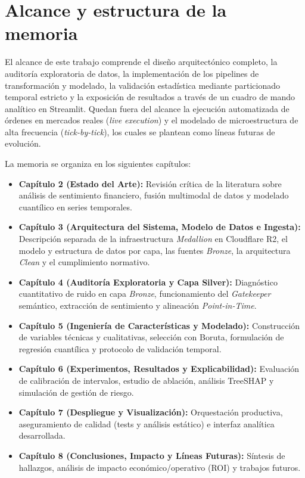\section{Alcance y estructura de la memoria}
El alcance de este trabajo comprende el diseño arquitectónico completo, la auditoría exploratoria de datos, la implementación de los pipelines de transformación y modelado, la validación estadística mediante particionado temporal estricto y la exposición de resultados a través de un cuadro de mando analítico en Streamlit. Quedan fuera del alcance la ejecución automatizada de órdenes en mercados reales (\textit{live execution}) y el modelado de microestructura de alta frecuencia (\textit{tick-by-tick}), los cuales se plantean como líneas futuras de evolución.

La memoria se organiza en los siguientes capítulos:
\begin{itemize}
    \item \textbf{Capítulo 2 (Estado del Arte):} Revisión crítica de la literatura sobre análisis de sentimiento financiero, fusión multimodal de datos y modelado cuantílico en series temporales.
    \item \textbf{Capítulo 3 (Arquitectura del Sistema, Modelo de Datos e Ingesta):} Descripción separada de la infraestructura \textit{Medallion} en Cloudflare R2, el modelo y estructura de datos por capa, las fuentes \textit{Bronze}, la arquitectura \textit{Clean} y el cumplimiento normativo.
    \item \textbf{Capítulo 4 (Auditoría Exploratoria y Capa Silver):} Diagnóstico cuantitativo de ruido en capa \textit{Bronze}, funcionamiento del \textit{Gatekeeper} semántico, extracción de sentimiento y alineación \textit{Point-in-Time}.
    \item \textbf{Capítulo 5 (Ingeniería de Características y Modelado):} Construcción de variables técnicas y cualitativas, selección con Boruta, formulación de regresión cuantílica y protocolo de validación temporal.
    \item \textbf{Capítulo 6 (Experimentos, Resultados y Explicabilidad):} Evaluación de calibración de intervalos, estudio de ablación, análisis TreeSHAP y simulación de gestión de riesgo.
    \item \textbf{Capítulo 7 (Despliegue y Visualización):} Orquestación productiva, aseguramiento de calidad (tests y análisis estático) e interfaz analítica desarrollada.
    \item \textbf{Capítulo 8 (Conclusiones, Impacto y Líneas Futuras):} Síntesis de hallazgos, análisis de impacto económico/operativo (ROI) y trabajos futuros.
\end{itemize}
